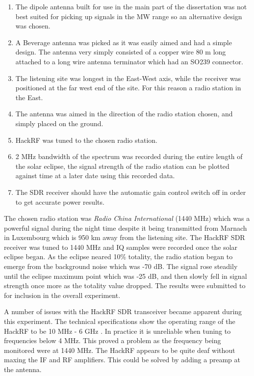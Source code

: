 \documentclass[runningheads,a4paper]{llncs}
\begin{document}
\begin{enumerate}
	\item The dipole antenna built for use in the main part of the dissertation was not best suited for picking up signals in the \gls{MW} range so an alternative design was chosen. 
	\item A Beverage antenna was picked as it was easily aimed and had a simple design. The antenna very simply consisted of a copper wire 80 m long attached to a long wire antenna terminator which had an SO239 connector.
	\item The listening site was longest in the East-West axis, while the receiver was positioned at the far west end of the site. For this reason a radio station in the East.
	\item The antenna was aimed in the direction of the radio station chosen, and simply placed on the ground.
	\item HackRF was tuned to the chosen radio station.
	\item 2 MHz bandwidth of the spectrum was recorded during the entire length of the solar eclipse, the signal strength of the radio station can be plotted against time at a later date using this recorded data.
	\item The \gls{SDR} receiver should have the automatic gain control switch off in order to get accurate power results. 
\end{enumerate}

The chosen radio station was \textit{Radio China International} (1440 MHz) which was a powerful signal during the night time despite it being transmitted from Marnach in Luxembourg which is 950 km away from the listening site. The HackRF \gls{SDR} receiver was tuned to 1440 MHz and \gls{IQ} samples were recorded once the solar eclipse began. As the eclipse neared 10\% totality, the radio station began to emerge from the background noise which was -70 dB. The signal rose steadily until the eclipse maximum point which was -25 dB, and then slowly fell in signal strength once more as the totality value dropped. The results were submitted to \citet{RSGB-15-b} for inclusion in the overall experiment.

A number of issues with the HackRF \gls{SDR} transceiver became apparent during this experiment. The technical specifications show the operating range of the HackRF to be 10 MHz - 6 GHz \citep{ossmann-15-d}. In practice it is unreliable when tuning to frequencies below 4 MHz. This proved a problem as the frequency being monitored were at 1440 MHz. The HackRF appears to be quite deaf without maxing the IF and RF amplifiers. This could be solved by adding a \gls{preamp} at the antenna.
\end{document}
